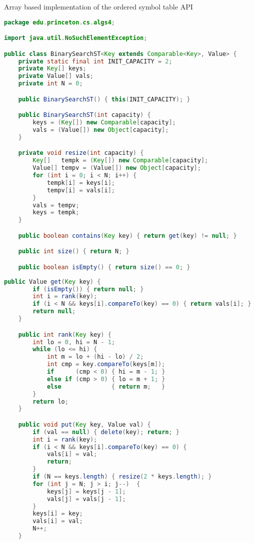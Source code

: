 \documentclass[8pt,a4paper,compress]{beamer}
\begin{document}
\begin{frame}[fragile]
\pause

Array based implementation of the ordered symbol table API

\begin{lstlisting}[language=Java]
package edu.princeton.cs.algs4;

import java.util.NoSuchElementException;

public class BinarySearchST<Key extends Comparable<Key>, Value> {
    private static final int INIT_CAPACITY = 2;
    private Key[] keys;
    private Value[] vals;
    private int N = 0;

    public BinarySearchST() { this(INIT_CAPACITY); }   

    public BinarySearchST(int capacity) { 
        keys = (Key[]) new Comparable[capacity]; 
        vals = (Value[]) new Object[capacity]; 
    }   

    private void resize(int capacity) {
        Key[]   tempk = (Key[]) new Comparable[capacity];
        Value[] tempv = (Value[]) new Object[capacity];
        for (int i = 0; i < N; i++) {
            tempk[i] = keys[i];
            tempv[i] = vals[i];
        }
        vals = tempv;
        keys = tempk;
    }

    public boolean contains(Key key) { return get(key) != null; }

    public int size() { return N; }

    public boolean isEmpty() { return size() == 0; }
\end{lstlisting}
\end{frame}

\begin{frame}[fragile]
\pause

\begin{lstlisting}[language=Java]
    public Value get(Key key) {
        if (isEmpty()) { return null; }
        int i = rank(key); 
        if (i < N && keys[i].compareTo(key) == 0) { return vals[i]; }
        return null;
    } 

    public int rank(Key key) {
        int lo = 0, hi = N - 1; 
        while (lo <= hi) { 
            int m = lo + (hi - lo) / 2; 
            int cmp = key.compareTo(keys[m]); 
            if      (cmp < 0) { hi = m - 1; }
            else if (cmp > 0) { lo = m + 1; } 
            else              { return m;   }
        } 
        return lo;
    } 

    public void put(Key key, Value val) {
        if (val == null) { delete(key); return; }
        int i = rank(key);
        if (i < N && keys[i].compareTo(key) == 0) {
            vals[i] = val;
            return;
        }
        if (N == keys.length) { resize(2 * keys.length); }
        for (int j = N; j > i; j--)  {
            keys[j] = keys[j - 1];
            vals[j] = vals[j - 1];
        }
        keys[i] = key;
        vals[i] = val;
        N++;
    } 
\end{lstlisting}
\end{frame}
\end{document}

